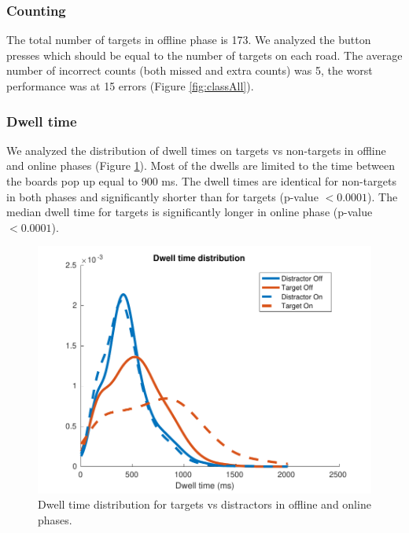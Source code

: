 \documentclass[12pt]{iopart}
\begin{document}
\subsubsection*{Counting}
The total number of targets in offline phase is 173.
We analyzed the button presses which should be equal to the number of targets
on each road.
The average number of incorrect counts (both missed and extra counts) was 5,
the worst performance was at 15 errors (Figure \ref{fig:classAll}).


\subsubsection*{Dwell time}
We analyzed the distribution of dwell times on targets vs non-targets
in offline and online phases (Figure \ref{fig:dwell}). 
Most of the dwells are limited to the time between the boards pop up equal to 900 ms.
The dwell times are identical for non-targets in both phases and significantly
shorter than for targets (p-value $< 0.0001$).
The median dwell time for targets is significantly longer in online phase (p-value $< 0.0001$).

\begin{figure}[!t]
    \includegraphics[trim={0cm 0cm 0cm 0cm},clip,width=0.6\columnwidth]{../images/DwelltimeDist_online_allmean.pdf}
    \caption{Dwell time distribution for targets vs distractors in offline and online phases.}
\label{fig:dwell}
\end{figure}
\end{document}
